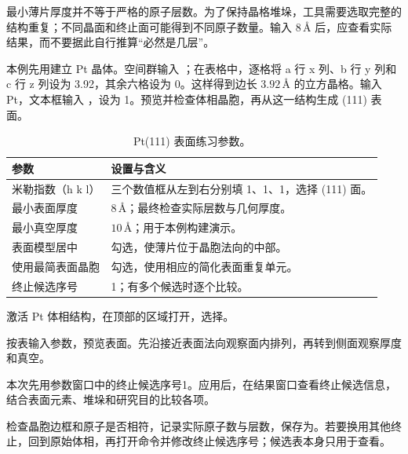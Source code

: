 

最小薄片厚度并不等于严格的原子层数。为了保持晶格堆垛，工具需要选取完整的结构重复；不同晶面和终止面可能得到不同原子数量。输入 $8\,\text{\AA}$ 后，应查看实际结果，而不要据此自行推算“必然是几层”。

本例先用建立 Pt 晶体。空间群输入 ；在表格中，逐格将 a 行 x 列、b 行 y 列和 c 行 z 列设为 3.92，其余六格设为 0。这样得到边长 $3.92\,\text{\AA}$ 的立方晶格。输入 Pt，文本框输入 ，设为 1。预览并检查体相晶胞，再从这一结构生成 (111) 表面。

\begin{table}[htbp]
\centering
\caption{Pt(111) 表面练习参数。}
\begin{tabularx}{\linewidth}{lX}
\toprule
参数 & 设置与含义 \\
\midrule
米勒指数（h k l） & 三个数值框从左到右分别填 1、1、1，选择 (111) 面。\\
最小表面厚度 & $8\,\text{\AA}$；最终检查实际层数与几何厚度。\\
最小真空厚度 & $10\,\text{\AA}$；用于本例构建演示。\\
表面模型居中 & 勾选，使薄片位于晶胞法向的中部。\\
使用最简表面晶胞 & 勾选，使用相应的简化表面重复单元。\\
终止候选序号 & 1；有多个候选时逐个比较。\\
\bottomrule
\end{tabularx}
\end{table}

\begin{steps}
  \item 激活 Pt 体相结构，在顶部的区域打开，选择。
  \item 按表输入参数，预览表面。先沿接近表面法向观察面内排列，再转到侧面观察厚度和真空。
  \item 本次先用参数窗口中的终止候选序号1。应用后，在结果窗口查看终止候选信息，结合表面元素、堆垛和研究目的比较各项。
  \item 检查晶胞边框和原子是否相符，记录实际原子数与层数，保存为。若要换用其他终止，回到原始体相，再打开命令并修改终止候选序号；候选表本身只用于查看。
\end{steps}





